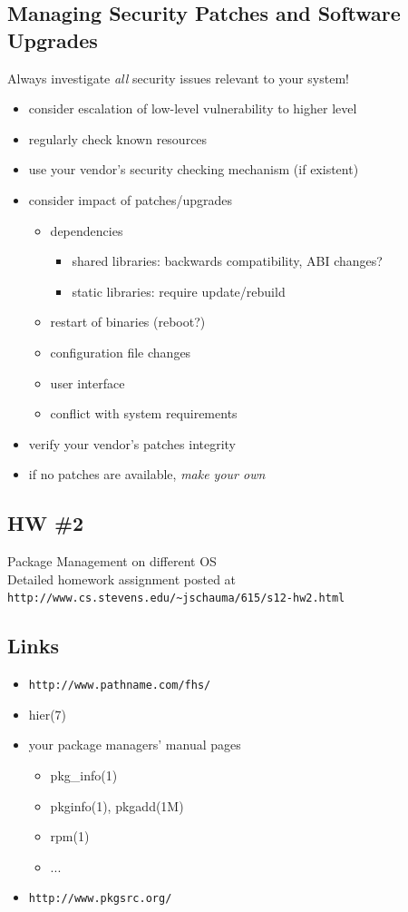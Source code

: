 \documentclass[xga]{xdvislides}
\begin{document}
\subsection{Managing Security Patches and Software Upgrades}
Always investigate {\em all} security issues relevant to your system!
\begin{itemize}
	\item consider escalation of low-level vulnerability to higher level
	\item regularly check known resources
	\item use your vendor's security checking mechanism (if existent)
	\item consider impact of patches/upgrades
		\begin{itemize}
			\item dependencies
				\begin{itemize}
					\item shared libraries:  backwards compatibility, ABI
						changes?
					\item static libraries:  require update/rebuild
				\end{itemize}
			\item restart of binaries (reboot?)
			\item configuration file changes
			\item user interface
			\item conflict with system requirements
		\end{itemize}
	\item verify your vendor's patches integrity
	\item if no patches are available, {\em make your own}
\end{itemize}

\subsection{HW \#2}
Package Management on different OS
\\

Detailed homework assignment posted at
\verb+http://www.cs.stevens.edu/~jschauma/615/s12-hw2.html+


\subsection{Links}
\begin{itemize}
	\item \verb+http://www.pathname.com/fhs/+
	\item hier(7)
	\item your package managers' manual pages
		\begin{itemize}
			\item pkg\_info(1)
			\item pkginfo(1), pkgadd(1M)
			\item rpm(1)
			\item ...
		\end{itemize}
	\item \verb+http://www.pkgsrc.org/+
\end{itemize}
\end{document}
